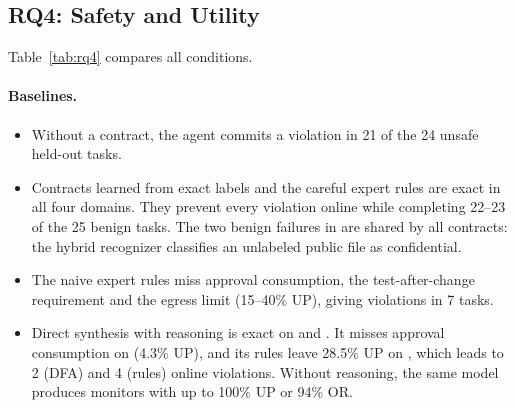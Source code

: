 
\subsection{RQ4: Safety and Utility}
\label{sec:rq4}

Table~\ref{tab:rq4} compares all conditions.

\paragraph{Baselines.}
\begin{itemize}
  \item Without a contract, the agent commits a violation in 21 of the 24 unsafe held-out tasks.
  \item Contracts learned from exact labels and the careful expert rules are exact in all four domains. They prevent
  every violation online while completing 22--23 of the 25 benign tasks. The two benign failures in  are
  shared by all contracts: the hybrid recognizer classifies an unlabeled public file as confidential.
  \item The naive expert rules miss approval consumption, the test-after-change requirement and the egress limit
  (15--40\% UP), giving violations in 7 tasks.
  \item Direct synthesis with reasoning is exact on  and . It misses approval consumption
  on  (4.3\% UP), and its rules leave 28.5\% UP on , which leads to 2 (DFA) and 4 (rules)
  online violations. Without reasoning, the same model produces monitors with up to 100\% UP or 94\% OR.
\end{itemize}


